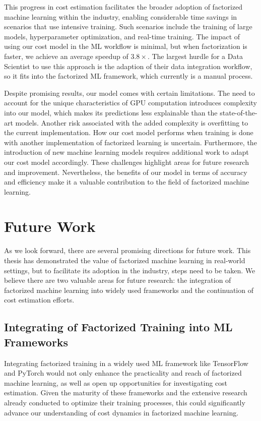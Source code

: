 This progress in cost estimation facilitates the broader adoption of factorized machine learning within the industry, enabling considerable time savings in scenarios that use intensive training. Such scenarios include the training of large models, hyperparameter optimization, and real-time training. The impact of using our cost model in the ML workflow is minimal, but when factorization is faster, we achieve an average speedup of $3.8\times$. The largest hurdle for a Data Scientist to use this approach is the adaption of their data integration workflow, so it fits into the factorized ML framework, which currently is a manual process.

Despite promising results, our model comes with certain limitations. The need to account for the unique characteristics of GPU computation introduces complexity into our model, which makes its predictions less explainable than the state-of-the-art models. Another risk associated with the added complexity is overfitting to the current implementation. How our cost model performs when training is done with another implementation of factorized learning is uncertain. Furthermore, the introduction of new machine learning models requires additional work to adapt our cost model accordingly. These challenges highlight areas for future research and improvement. Nevertheless, the benefits of our model in terms of accuracy and efficiency make it a valuable contribution to the field of factorized machine learning.

\section{Future Work}
\label{sec:7-future-work}
As we look forward, there are several promising directions for future work. This thesis has demonstrated the value of factorized machine learning in real-world settings, but to facilitate its adoption in the industry, steps need to be taken. We believe there are two valuable areas for future research: the integration of factorized machine learning into widely used frameworks and the continuation of cost estimation efforts.

\subsection{Integrating of Factorized Training into ML Frameworks}
Integrating factorized training in a widely used ML framework like TensorFlow and PyTorch would not only enhance the practicality and reach of factorized machine learning, as well as open up opportunities for investigating cost estimation. Given the maturity of these frameworks and the extensive research already conducted to optimize their training processes, this could significantly advance our understanding of cost dynamics in factorized machine learning.

